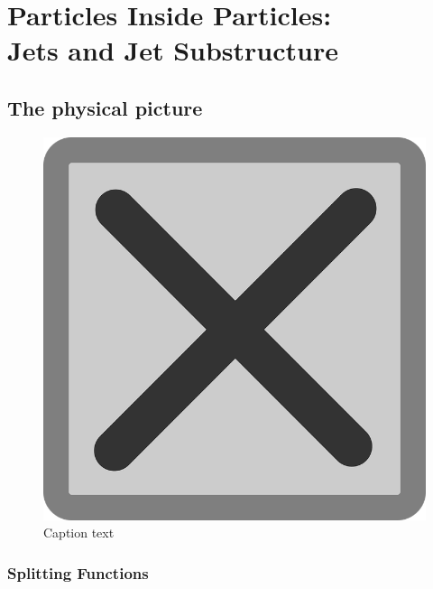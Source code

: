 \chapter{Particles Inside Particles:\\Jets and Jet Substructure}

\section{The physical picture}

\begin{figure}[t!]
    \centering
    \includegraphics[width=\textwidth]{figures/tempfig}

    \caption{
        Caption text
    }

    \label{fig:label}
\end{figure}


\subsection{Splitting Functions}

